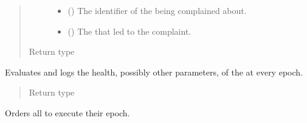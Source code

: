\documentclass[letterpaper,10pt,english]{sphinxmanual}
\begin{document}
\begin{fulllineitems}
\begin{fulllineitems}
\begin{quote}
\begin{description}
\begin{itemize}
\item {} 
 () \textendash{} The identifier of the {\hyperref[\detokenize{app.domain:app.domain.network_nodes.Node}]{}} being complained about.

\item {} 
 ({\hyperref[\detokenize{app:app.type_hints.HttpResponse}]{}}) \textendash{} The {\hyperref[\detokenize{app.domain.helpers:app.domain.helpers.enums.HttpCodes}]{}}
that led to the complaint.

\end{itemize}

\item[{Return type}] \leavevmode
{}

\end{description}\end{quote}

\end{fulllineitems}


\begin{fulllineitems}
\label{\detokenize{app.domain:app.domain.cluster_groups.Cluster.evaluate}}
Evaluates and logs the health, possibly other parameters, of the
 at every epoch.
\begin{quote}\begin{description}
\item[{Return type}] \leavevmode
{}

\end{description}\end{quote}

\end{fulllineitems}


\begin{fulllineitems}
\label{\detokenize{app.domain:app.domain.cluster_groups.Cluster.execute_epoch}}
Orders all {\hyperref[\detokenize{app.domain:app.domain.cluster_groups.Cluster.members}]{}} to execute their epoch.


\end{fulllineitems}
\end{fulllineitems}
\end{document}
